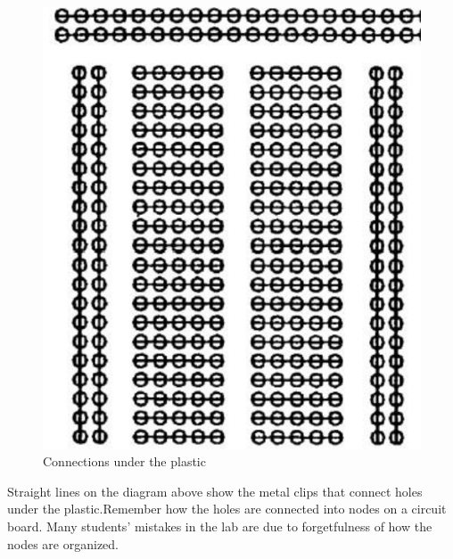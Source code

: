 \documentclass[12pt]{article}
\begin{document}
\begin{figure}[H]
\centering
\includegraphics[scale=0.5]{P4.jpg}
\caption{Connections under the plastic}
\end{figure}
\par Straight lines on the diagram above show the metal clips that connect holes under the plastic.Remember how the holes are connected into nodes on a circuit board. Many students’ mistakes in the lab are due to forgetfulness of how the nodes are organized.
\end{document}
